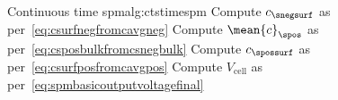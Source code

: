 {\begin{customalgo}[1.0\textwidth]{Continuous time \gls{spm}}{alg:ctstimespm}
        \State Compute $c_\snegsurf$ as per~\cref{eq:csurfnegfromcavgneg}
        \State Compute $\mean{c}_\spos$ as per~\cref{eq:csposbulkfromcsnegbulk}
        \State Compute $c_\spossurf$ as per~\cref{eq:csurfposfromcavgpos}
        \State Compute $V_\text{cell}$ as per~\cref{eq:spmbasicoutputvoltagefinal}
        \EndOutputEqn%
    \end{customalgo}
}%
